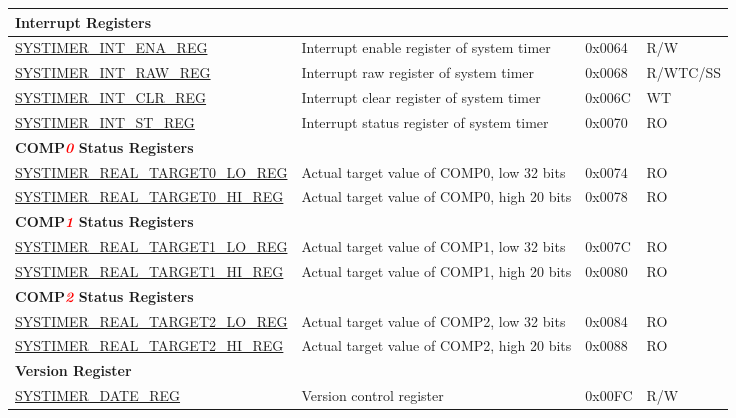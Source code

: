 \begin{longtable}{ | p{6cm} | p{7.2cm} | p{1.3cm} | p{1.5cm} | }
\multicolumn{4}{|l|}{\textbf{Interrupt Registers}} \\ \hline
\hyperref[regdesc:SYSTIMERINTENAREG]{SYSTIMER\_INT\_ENA\_REG} & Interrupt enable register of system timer & 0x0064 & R/W \\ \hline
\hyperref[regdesc:SYSTIMERINTRAWREG]{SYSTIMER\_INT\_RAW\_REG} & Interrupt raw register of system timer & 0x0068 & R/WTC/SS \\ \hline
\hyperref[regdesc:SYSTIMERINTCLRREG]{SYSTIMER\_INT\_CLR\_REG} & Interrupt clear register of system timer & 0x006C & WT \\ \hline
\hyperref[regdesc:SYSTIMERINTSTREG]{SYSTIMER\_INT\_ST\_REG} & Interrupt status register of system timer & 0x0070 & RO \\ \hline
\multicolumn{4}{|l|}{\textbf{COMP\textcolor{red}{\it{0}} Status Registers}} \\ \hline
\hyperref[regdesc:SYSTIMERREALTARGET0LOREG]{SYSTIMER\_REAL\_TARGET0\_LO\_REG} & Actual target value of COMP0, low 32 bits & 0x0074 & RO \\ \hline
\hyperref[regdesc:SYSTIMERREALTARGET0HIREG]{SYSTIMER\_REAL\_TARGET0\_HI\_REG} & Actual target value of COMP0, high 20 bits & 0x0078 & RO \\ \hline
\multicolumn{4}{|l|}{\textbf{COMP\textcolor{red}{\it{1}} Status Registers}} \\ \hline
\hyperref[regdesc:SYSTIMERREALTARGET1LOREG]{SYSTIMER\_REAL\_TARGET1\_LO\_REG} & Actual target value of COMP1, low 32 bits & 0x007C & RO \\ \hline
\hyperref[regdesc:SYSTIMERREALTARGET1HIREG]{SYSTIMER\_REAL\_TARGET1\_HI\_REG} & Actual target value of COMP1, high 20 bits & 0x0080 & RO \\ \hline
\multicolumn{4}{|l|}{\textbf{COMP\textcolor{red}{\it{2}} Status Registers}} \\ \hline
\hyperref[regdesc:SYSTIMERREALTARGET2LOREG]{SYSTIMER\_REAL\_TARGET2\_LO\_REG} & Actual target value of COMP2, low 32 bits & 0x0084 & RO \\ \hline
\hyperref[regdesc:SYSTIMERREALTARGET2HIREG]{SYSTIMER\_REAL\_TARGET2\_HI\_REG} & Actual target value of COMP2, high 20 bits & 0x0088 & RO \\ \hline
\multicolumn{4}{|l|}{\textbf{Version Register}} \\ \hline
\hyperref[regdesc:SYSTIMERDATEREG]{SYSTIMER\_DATE\_REG} & Version control register & 0x00FC & R/W \\ \hline
\end{longtable}
